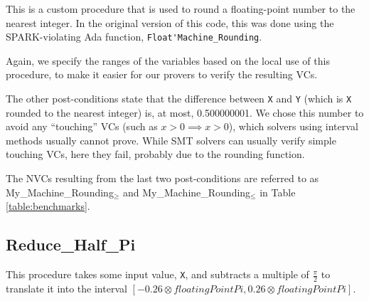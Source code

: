 \documentclass[runningheads]{llncs}
\begin{document}
This is a custom procedure that is used to round a floating-point number to the nearest integer.
In the original version of this code, this was done using the SPARK-violating Ada function, \lstinline{Float'Machine_Rounding}.

Again, we specify the ranges of the variables based on the local use of this procedure, to make it easier for our provers to verify the resulting VCs.

The other post-conditions state that the difference between \lstinline{X} and \lstinline{Y} (which is \lstinline{X} rounded to the nearest integer) is, at most, 0.500000001.
We chose this number to avoid any ``touching'' VCs (such as $x > 0 \implies x > 0$), which solvers using interval methods usually cannot prove.  
While SMT solvers can usually verify simple touching VCs, here they fail, probably due to the rounding function.

The NVCs resulting from the last two post-conditions are referred to as My\_Machine\_Rounding${}_\ge$ and My\_Machine\_Rounding${}_\le$ in Table \ref{table:benchmarks}.

\subsection{Reduce\_Half\_Pi}

This procedure takes some input value, \lstinline{X}, and subtracts a multiple of $\frac{\pi}{2}$ to translate it into the interval $[-0.26 \otimes \textit{floatingPointPi}, 0.26 \otimes \textit{floatingPointPi}]$.
\end{document}
